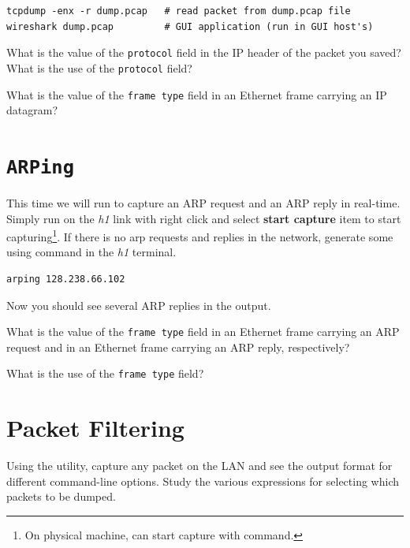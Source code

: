\documentclass{../UTNetLab}
\begin{document}
\begin{lstlisting}[emph={dump,pcap}]
tcpdump -enx -r dump.pcap   # read packet from dump.pcap file
wireshark dump.pcap         # GUI application (run in GUI host's)
\end{lstlisting}

\begin{report}
    \item What is the value of the \texttt{protocol} field in the IP header of the packet you saved?
    What is the use of the \texttt{protocol} field?

    \item What is the value of the \texttt{frame type} field in an Ethernet frame carrying an IP datagram?
\end{report}

\section{\texttt{ARPing}}
This time we will run  to capture an ARP request and an ARP reply in real-time.
Simply run  on the \textit{h1} link with right click and select \textbf{start capture} item to start capturing\footnote{On physical machine, can start capture with  command.}.
If there is no arp requests and replies in the network, generate some using  command in the \textit{h1} terminal.

\begin{lstlisting}
arping 128.238.66.102
\end{lstlisting}

Now you should see several ARP replies in the  output.

\begin{report}
    \item What is the value of the \texttt{frame type} field in an Ethernet frame carrying an ARP request and in an Ethernet frame carrying an ARP reply, respectively?

    \item What is the use of the \texttt{frame type} field?
\end{report}

\section{Packet Filtering}
Using the  utility, capture any packet on the LAN and see the output format
for different command-line options.
Study the various expressions for selecting
which packets to be dumped.
\end{document}
